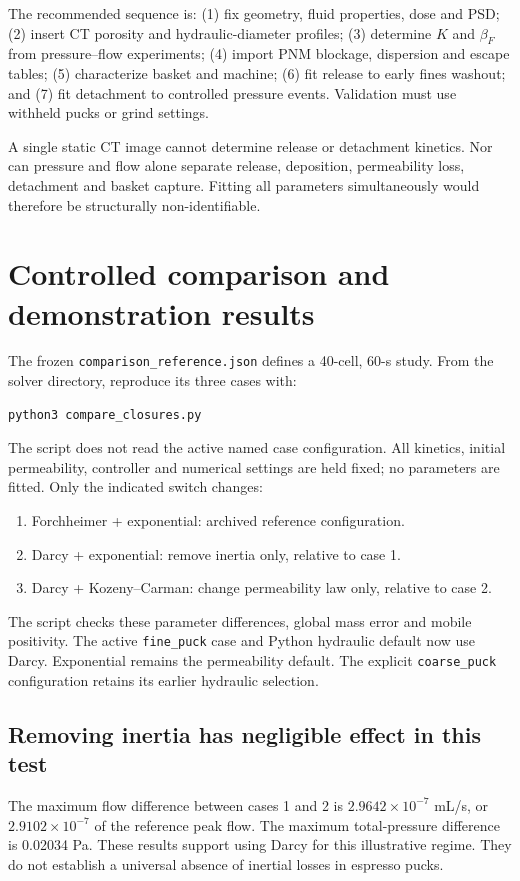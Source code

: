 \documentclass[11pt,a4paper]{article}
\newcommand{\code}[1]{\texttt{#1}}
\begin{document}
The recommended sequence is: (1) fix geometry, fluid properties, dose and PSD;
(2) insert CT porosity and hydraulic-diameter profiles; (3) determine $K$ and
$\beta_F$ from pressure--flow experiments; (4) import PNM blockage, dispersion
and escape tables; (5) characterize basket and machine; (6) fit release to
early fines washout; and (7) fit detachment to controlled pressure events.
Validation must use withheld pucks or grind settings.

A single static CT image cannot determine release or detachment kinetics. Nor
can pressure and flow alone separate release, deposition, permeability loss,
detachment and basket capture. Fitting all parameters simultaneously would
therefore be structurally non-identifiable.

\section{Controlled comparison and demonstration results}

The frozen \code{comparison\_reference.json} defines a 40-cell, 60-s study.
From the solver directory, reproduce its three cases with:
\begin{verbatim}
python3 compare_closures.py
\end{verbatim} The script does not read the active named case configuration.
All kinetics, initial permeability, controller and numerical settings are held
fixed; no parameters are fitted. Only the indicated switch changes:
\begin{enumerate}
\item Forchheimer + exponential: archived reference configuration.
\item Darcy + exponential: remove inertia only, relative to case 1.
\item Darcy + Kozeny--Carman: change permeability law only, relative to case 2.
\end{enumerate}
The script checks these parameter differences, global mass error and mobile
positivity. The active \code{fine\_puck} case and Python hydraulic default now
use Darcy. Exponential remains the permeability default. The explicit
\code{coarse\_puck} configuration retains its earlier hydraulic selection.

\subsection{Removing inertia has negligible effect in this test}

The maximum flow difference between cases 1 and 2 is
$2.9642\times10^{-7}$ mL/s, or $2.9102\times10^{-7}$ of the reference peak flow.
The maximum total-pressure difference is 0.02034 Pa. These results support
using Darcy for this illustrative regime. They do not establish a universal
absence of inertial losses in espresso pucks.
\end{document}

